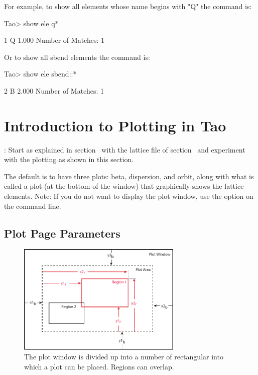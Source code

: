 \documentclass{hitec}
\newcommand{\Section}[1]{\section{#1}\vspace*{-1ex}}
\begin{document}
For example, to show all elements whose name begins with "Q" the command is:
\begin{code}
Tao> show ele q*

         1  Q                                                1.000
Number of Matches: 1
\end{code}

Or to show all sbend elements the command is:
\begin{code}  
Tao> show ele sbend::*

         2  B                                                2.000
Number of Matches: 1
\end{code}

\Section{Introduction to Plotting in Tao}

: Start \tao as explained in section~ with the lattice file
 of section~ and experiment with the plotting as shown 
in this section.

The default is to have three plots: beta, dispersion, and
orbit, along with what is called a  plot (at the bottom of the window) that
graphically shows the lattice elements. Note: If you do not want \tao to display the plot window,
use the  option on the command line.

\subsection{Plot Page Parameters}

\begin{figure}[tb]
  \centering
  \includegraphics[width=0.7\textwidth]{plot-page.pdf}
  \caption{The plot window is divided up into a number of rectangular  into
which a plot  can be placed. Regions can overlap.}
  \label{f:plot.regions}
\end{figure}
\end{document}
